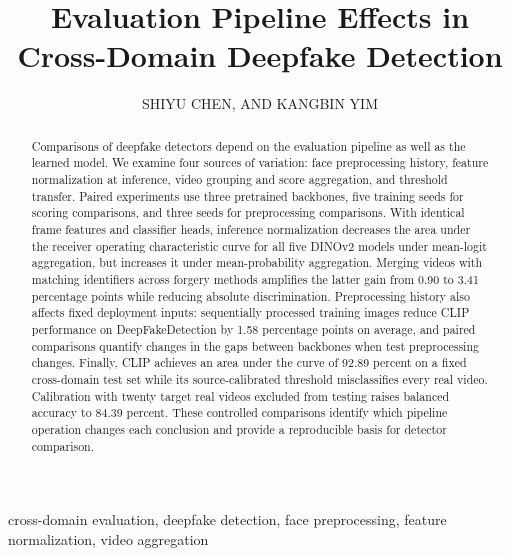 \documentclass{ieeeaccess}
\begin{document}
\title{Evaluation Pipeline Effects in Cross-Domain Deepfake Detection}
\author{\uppercase{Shiyu Chen}, AND
\uppercase{Kangbin Yim}}
\address[1]{Department of Software Convergence, Soonchunhyang University,
Asan 31538, Republic of Korea (e-mail: chen@sch.ac.kr)}
\address[2]{Department of Information Security, Soonchunhyang University,
Asan 31538, Republic of Korea (e-mail: yim@sch.ac.kr)}
\begin{abstract}
Comparisons of deepfake detectors depend on the evaluation pipeline as
well as the learned model. We examine four sources of variation: face
preprocessing history, feature normalization at inference, video
grouping and score aggregation, and threshold transfer. Paired
experiments use three pretrained backbones, five training seeds for
scoring comparisons, and three seeds for preprocessing comparisons. With
identical frame features and classifier heads, inference normalization
decreases the area under the receiver operating characteristic curve for
all five DINOv2 models under mean-logit aggregation, but increases it
under mean-probability aggregation. Merging videos with matching
identifiers across forgery methods amplifies the latter gain from 0.90
to 3.41 percentage points while reducing absolute discrimination.
Preprocessing history also affects fixed deployment inputs: sequentially
processed training images reduce CLIP performance on DeepFakeDetection
by 1.58 percentage points on average, and paired comparisons quantify
changes in the gaps between backbones when test preprocessing changes.
Finally, CLIP achieves an area under the curve of 92.89 percent on a
fixed cross-domain test set while its source-calibrated threshold
misclassifies every real video. Calibration with twenty target real
videos excluded from testing raises balanced accuracy to 84.39 percent.
These controlled comparisons identify which pipeline operation changes
each conclusion and provide a reproducible basis for detector
comparison.
\end{abstract}
\begin{keywords}
cross-domain evaluation, deepfake detection, face preprocessing, feature
normalization, video aggregation
\end{keywords}
\titlepgskip=-21pt
\maketitle
\end{document}
